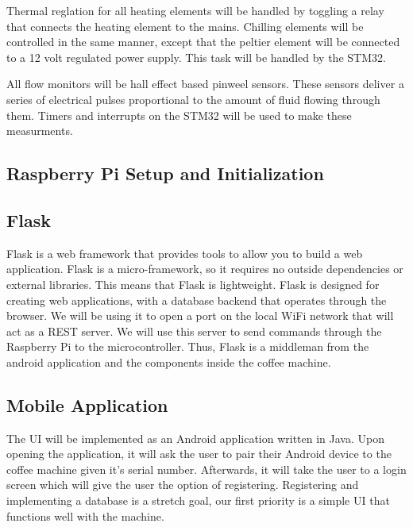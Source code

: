 \documentclass[conference]{IEEEtran}
\begin{document}
Thermal reglation for all heating elements will be handled by toggling a relay
that connects the heating element to the mains. Chilling elements will be
controlled in the same manner, except that the peltier element will be connected
to a 12 volt regulated power supply. This task will be handled by the STM32.
	
All flow monitors will be hall effect based pinweel sensors. These sensors
deliver a series of electrical pulses proportional to the amount of fluid
flowing through them. Timers and interrupts on the STM32 will be used to make
these measurments. 

\subsection{Raspberry Pi Setup and Initialization}


\subsection{Flask}
Flask is a web framework that provides tools to allow you to build a web application.
Flask is a micro-framework, so it requires no outside dependencies or external libraries.
This means that Flask is lightweight. Flask is designed for creating web applications,
with a database backend that operates through the browser. We will be using it to open
a port on the local WiFi network that will act as a REST server. We will use
this server to send commands through the Raspberry Pi to the microcontroller. Thus, Flask is a middleman from the 
android application and the components inside the coffee machine.

\subsection{Mobile Application}
The UI will be implemented as an Android application written in Java. Upon
opening the application, it will ask the user to pair their Android device to
the coffee machine given it's serial number. Afterwards, it will take the user
to a login screen which will give the user the option of registering.
Registering and implementing a database is a stretch goal, our first
priority is a simple UI that functions well with the machine.
\end{document}
